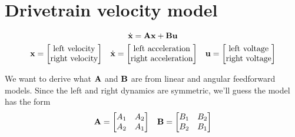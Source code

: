 \section{Drivetrain velocity model}
\begin{equation*}
  \dot{\mathbf{x}} = \mathbf{A}\mathbf{x} + \mathbf{B}\mathbf{u}
\end{equation*}
\begin{equation*}
  \begin{array}{ccc}
    \mathbf{x} = \begin{bmatrix}
      \text{left velocity} \\
      \text{right velocity}
    \end{bmatrix} &
    \dot{\mathbf{x}} = \begin{bmatrix}
      \text{left acceleration} \\
      \text{right acceleration}
    \end{bmatrix} &
    \mathbf{u} = \begin{bmatrix}
      \text{left voltage} \\
      \text{right voltage}
    \end{bmatrix}
  \end{array}
\end{equation*}

We want to derive what $\mathbf{A}$ and $\mathbf{B}$ are from linear and angular
feedforward models. Since the left and right dynamics are symmetric, we'll guess
the model has the form
\begin{equation*}
  \begin{array}{cc}
    \mathbf{A} = \begin{bmatrix}
      A_1 & A_2 \\
      A_2 & A_1
    \end{bmatrix} &
    \mathbf{B} = \begin{bmatrix}
      B_1 & B_2 \\
      B_2 & B_1
    \end{bmatrix}
  \end{array}
\end{equation*}

